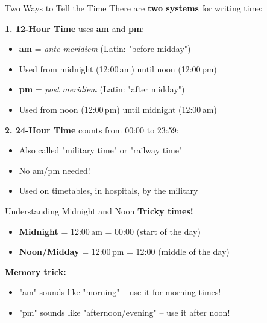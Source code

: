 \documentclass[12pt,a4paper]{article}
\begin{document}
\begin{conceptbox}{Two Ways to Tell the Time}
There are \textbf{two systems} for writing time:

\textbf{1. 12-Hour Time} uses \textbf{am} and \textbf{pm}:
\begin{itemize}[leftmargin=*]
\item \textbf{am} = \textit{ante meridiem} (Latin: "before midday")
\item Used from midnight (12:00\,am) until noon (12:00\,pm)
\item \textbf{pm} = \textit{post meridiem} (Latin: "after midday")
\item Used from noon (12:00\,pm) until midnight (12:00\,am)
\end{itemize}

\textbf{2. 24-Hour Time} counts from 00:00 to 23:59:
\begin{itemize}[leftmargin=*]
\item Also called "military time" or "railway time"
\item No am/pm needed!
\item Used on timetables, in hospitals, by the military
\end{itemize}

\begin{center}
\end{center}
\end{conceptbox}

\begin{tipbox}{Understanding Midnight and Noon}
\textbf{Tricky times!}
\begin{itemize}[leftmargin=*]
\item \textbf{Midnight} = 12:00\,am = 00:00 (start of the day)
\item \textbf{Noon/Midday} = 12:00\,pm = 12:00 (middle of the day)
\end{itemize}

\textbf{Memory trick:} 
\begin{itemize}[leftmargin=*]
\item "am" sounds like "morning" -- use it for morning times!
\item "pm" sounds like "afternoon/evening" -- use it after noon!
\end{itemize}
\end{tipbox}
\end{document}
